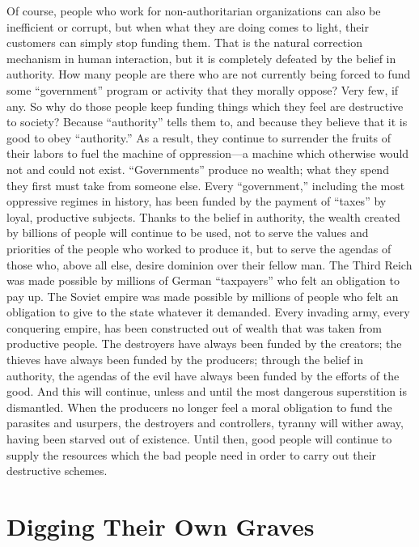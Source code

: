 \documentclass{book}
\begin{document}
Of course, people who work for non-authoritarian organizations can also be inefficient or corrupt, but when what they are doing comes to light, their customers can simply stop funding them. That is the natural correction mechanism in human interaction, but it is completely defeated by the belief in authority. How many people are there who are not currently being forced to fund some \enquote{government} program or activity that they morally oppose? Very few, if any. So why do those people keep funding things which they feel are destructive to society? Because \enquote{authority} tells them to, and because they believe that it is good to obey \enquote{authority.} As a result, they continue to surrender the fruits of their labors to fuel the machine of oppression---a machine which otherwise would not and could not exist. \enquote{Governments} produce no wealth; what they spend they first must take from someone else. Every \enquote{government,} including the most oppressive regimes in history, has been funded by the payment of \enquote{taxes} by loyal, productive subjects. Thanks to the belief in authority, the wealth created by billions of people will continue to be used, not to serve the values and priorities of the people who worked to produce it, but to serve the agendas of those who, above all else, desire dominion over their fellow man. The Third Reich was made possible by millions of German \enquote{taxpayers} who felt an obligation to pay up. The Soviet empire was made possible by millions of people who felt an obligation to give to the state whatever it demanded. Every invading army, every conquering empire, has been constructed out of wealth that was taken from productive people. The destroyers have always been funded by the creators; the thieves have always been funded by the producers; through the belief in authority, the agendas of the evil have always been funded by the efforts of the good. And this will continue, unless and until the most dangerous superstition is dismantled. When the producers no longer feel a moral obligation to fund the parasites and usurpers, the destroyers and controllers, tyranny will wither away, having been starved out of existence. Until then, good people will continue to supply the resources which the bad people need in order to carry out their destructive schemes.

\section{Digging Their Own Graves}
\end{document}
